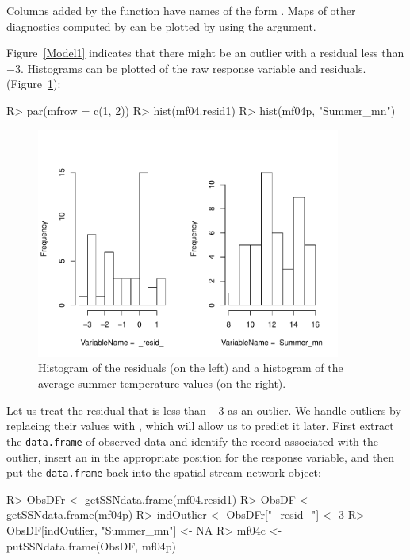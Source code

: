 \documentclass[nojss]{jss}
\renewenvironment{Schunk}{\vspace{\topsep}}{\vspace{\topsep}}
\begin{document}
Columns added by the  function have names of the form
\code{_*_}. Maps of other diagnostics computed by  can
be plotted by using the  argument.

Figure~\ref{Model1} indicates that there might be an outlier with a
residual less than $-3$. Histograms can be plotted of the raw
response variable and residuals.
(Figure~\ref{ResidHist}):

\begin{Schunk}
\begin{Sinput}
R> par(mfrow = c(1, 2))
R> hist(mf04.resid1)
R> hist(mf04p, "Summer_mn")
\end{Sinput}
\end{Schunk}

\begin{figure}[htbp]
  \begin{center}
    \includegraphics[keepaspectratio=true, width = 100mm]{Figures/jss984Fig-ResidHist}
    \caption{Histogram of the residuals (on the left) and a histogram of the average
      summer temperature values (on the right). \label{ResidHist}}
  \end{center}
\end{figure}

Let us treat the residual that is less than $-3$ as an outlier. We handle outliers by replacing their values with , which
will allow us to predict it later. First extract the {\tt data.frame}
of observed data and identify the record associated with the outlier,
insert an  in the appropriate position for the response
variable, and then put the {\tt data.frame} back into the spatial
stream network object:

\begin{Schunk}
\begin{Sinput}
R> ObsDFr <- getSSNdata.frame(mf04.resid1)
R> ObsDF <- getSSNdata.frame(mf04p)
R> indOutlier <- ObsDFr["_resid_"] < -3
R> ObsDF[indOutlier, "Summer_mn"] <- NA
R> mf04c <- putSSNdata.frame(ObsDF, mf04p)
\end{Sinput}
\end{Schunk}
\end{document}
